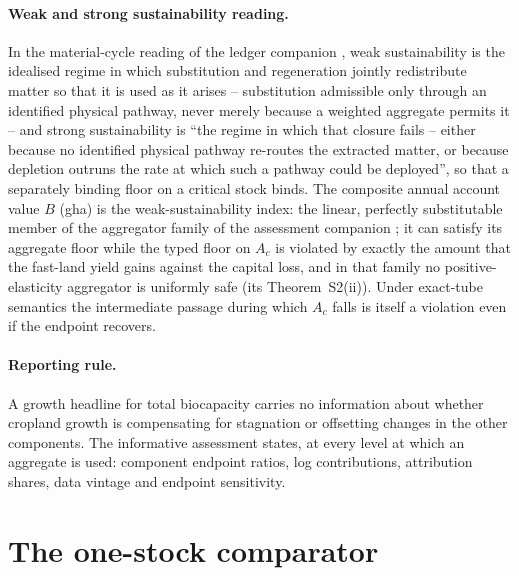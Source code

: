 \documentclass[11pt,a4paper]{article}
\begin{document}
\paragraph{Weak and strong sustainability reading.} In the material-cycle reading of the ledger companion \citep{Abaee2026c}, weak sustainability is the idealised regime in which substitution and regeneration jointly redistribute matter so that it is used as it arises -- substitution admissible only through an identified physical pathway, never merely because a weighted aggregate permits it -- and strong sustainability is ``the regime in which that closure fails -- either because no identified physical pathway re-routes the extracted matter, or because depletion outruns the rate at which such a pathway could be deployed'', so that a separately binding floor on a critical stock binds. The composite annual account value $B$ (gha) is the weak-sustainability index: the linear, perfectly substitutable member of the aggregator family of the assessment companion \citep[Lemma~A of][]{Abaee2026b}; it can satisfy its aggregate floor while the typed floor on $A_c$ is violated by exactly the amount that the fast-land yield gains against the capital loss, and in that family no positive-elasticity aggregator is uniformly safe (its Theorem~S2(ii)). Under exact-tube semantics the intermediate passage during which $A_c$ falls is itself a violation even if the endpoint recovers.

\paragraph{Reporting rule.} A growth headline for total biocapacity carries no information about whether cropland growth is compensating for stagnation or offsetting changes in the other components. The informative assessment states, at every level at which an aggregate is used: component endpoint ratios, log contributions, attribution shares, data vintage and endpoint sensitivity.

\section{The one-stock comparator}\label{si:onestock}
\end{document}
